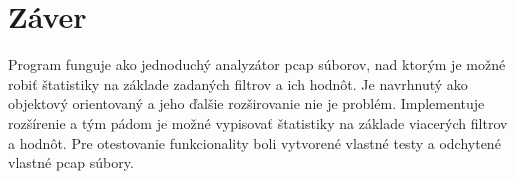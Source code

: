 \documentclass[10pt,a4paper,final]{article}
\begin{document}
\section{Záver}
Program funguje ako jednoduchý analyzátor pcap súborov, nad ktorým je možné robiť štatistiky na základe zadaných filtrov a ich hodnôt. Je navrhnutý ako objektový orientovaný a jeho ďalšie rozširovanie nie je problém. Implementuje rozšírenie a tým pádom je možné vypisovať štatistiky na základe viacerých filtrov a hodnôt. Pre otestovanie funkcionality boli vytvorené vlastné testy a odchytené vlastné pcap súbory.


\newpage

\renewcommand{\refname}{Literatura}
\raggedright

\end{document}
